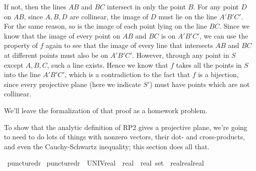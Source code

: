\begin{isabellebody}
\begin{isamarkuptext}
If not, then the lines $AB$ and $BC$ intersect in only the point $B$. For any point 
$D$ on $AB$, since $A,B,D$ are collinear, the image of $D$ must lie on the line 
$A'B'C'$. For the same reason, so is the image of each point lying on the line $BC$. 
Since we know that the image of every point on $AB$ and $BC$ is on $A'B'C'$, we can 
use the property of $f$ again to see that the image of every line that intersects 
$AB$ and $BC$ at different points must also be on $A'B'C'$. However, through any point 
in $S$ except $A,B,C$, such a line exists. Hence we know that $f$ takes all the points 
in $S$ into the line $A'B'C'$, which is a contradiction to the fact that $f$ is a 
bijection, since every projective plane (here we indicate $S'$) must have  points 
which are not collinear.

We'll leave the formalization of that proof as a homework problem.
\done%
\end{isamarkuptext}\isamarkuptrue%
%
\isadelimdocument
%
\endisadelimdocument
%
\isatagdocument
%
\isamarkuptrue%
%
\endisatagdocument
{\isafolddocument}%
%
\isadelimdocument
%
\endisadelimdocument
%
\begin{isamarkuptext}%
To show that the analytic definition of RP2 gives
a projective plane, we're going to need to do lots of things 
with nonzero vectors, their dot- and cross-products, and 
even the Cauchy-Schwartz inequality; this section does all that.%
\end{isamarkuptext}\isamarkuptrue%
\isamarkupfalse%
\ punctured{\isacharunderscore}{\kern0pt}r{\isacharunderscore}{\kern0pt}{}\ \isanewline
{\isachardoublequoteopen}punctured{\isacharunderscore}{\kern0pt}r{\isacharunderscore}{\kern0pt}{}\ {\isacharequal}{\kern0pt}\ {\isacharparenleft}{\kern0pt}UNIV{\isacharcolon}{\kern0pt}{\isacharcolon}{\kern0pt}{\isacharparenleft}{\kern0pt}{\isacharparenleft}{\kern0pt}real\ {\isasymtimes}\ real\ {\isasymtimes}\ real{\isacharparenright}{\kern0pt}\ set{\isacharparenright}{\kern0pt}{\isacharparenright}{\kern0pt}\ {\isacharminus}{\kern0pt}\ {\isacharbraceleft}{\kern0pt}{\isacharparenleft}{\kern0pt}{}{\isacharcolon}{\kern0pt}{\isacharcolon}{\kern0pt}real{\isacharcomma}{\kern0pt}{}{\isacharcolon}{\kern0pt}{\isacharcolon}{\kern0pt}real{\isacharcomma}{\kern0pt}{}{\isacharcolon}{\kern0pt}{\isacharcolon}{\kern0pt}real{\isacharparenright}{\kern0pt}{\isacharbraceright}{\kern0pt}{\isachardoublequoteclose}\isanewline

\end{isabellebody}

